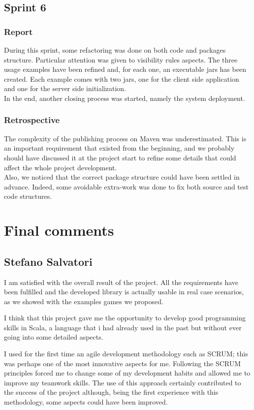 \subsection{Sprint 6}

\subsubsection{Report}
During this sprint, some refactoring was done on both code and packages structure. Particular attention was given to visibility rules aspects.
The three usage examples have been refined and, for each one, an executable jars has been created. Each example comes with two jars, one for the client side application and one for the server side initialization.
\\
In the end, another closing process was started, namely the system deployment.


\subsubsection{Retrospective}
The complexity of the publishing process on Maven was underestimated.
This is an important requirement that existed from the beginning, and we probably should have discussed it at the project start to refine some details that could affect the whole project development.
\\
Also, we noticed that the correct package structure could have been settled in advance.
Indeed, some avoidable extra-work was done to fix both source and test code structures.

\section{Final comments}
\subsection{Stefano Salvatori}
I am satisfied with the overall result of the project.
All the requirements have been fulfilled and the developed library is actually usable in real case scenarios, as we showed with the examples games we proposed.

I think that this project gave me the opportunity to develop good programming skills in Scala, a language that i had already used in the past but without ever going into some detailed aspects.

I used for the first time an agile development methodology such as SCRUM; this was perhaps one of the most innovative aspects for me. Following the SCRUM principles forced me to change some of my development habits and allowed me to improve my teamwork skills.
The use of this approach certainly contributed to the success of the project although, being the first experience with this methodology, some aspects could have been improved.

